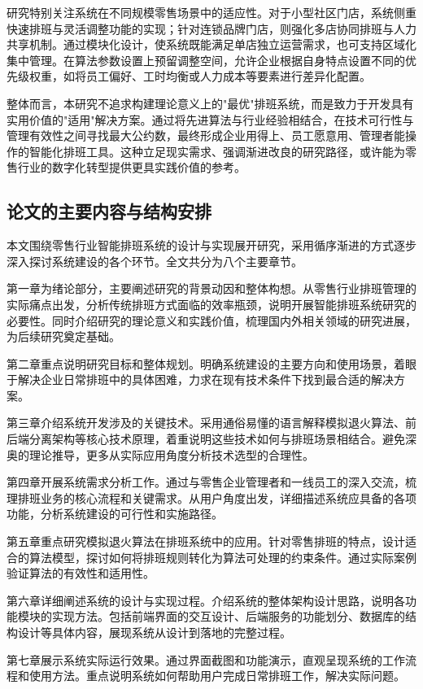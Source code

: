 \documentclass{ctexart}
\begin{document}
研究特别关注系统在不同规模零售场景中的适应性。对于小型社区门店，系统侧重快速排班与灵活调整功能的实现；针对连锁品牌门店，则强化多店协同排班与人力共享机制。通过模块化设计，使系统既能满足单店独立运营需求，也可支持区域化集中管理。在算法参数设置上预留调整空间，允许企业根据自身特点设置不同的优先级权重，如将员工偏好、工时均衡或人力成本等要素进行差异化配置。

整体而言，本研究不追求构建理论意义上的"最优"排班系统，而是致力于开发具有实用价值的"适用"解决方案。通过将先进算法与行业经验相结合，在技术可行性与管理有效性之间寻找最大公约数，最终形成企业用得上、员工愿意用、管理者能操作的智能化排班工具。这种立足现实需求、强调渐进改良的研究路径，或许能为零售行业的数字化转型提供更具实践价值的参考。

\subsection{论文的主要内容与结构安排}
本文围绕零售行业智能排班系统的设计与实现展开研究，采用循序渐进的方式逐步深入探讨系统建设的各个环节。全文共分为八个主要章节。

第一章为绪论部分，主要阐述研究的背景动因和整体构想。从零售行业排班管理的实际痛点出发，分析传统排班方式面临的效率瓶颈，说明开展智能排班系统研究的必要性。同时介绍研究的理论意义和实践价值，梳理国内外相关领域的研究进展，为后续研究奠定基础。

第二章重点说明研究目标和整体规划。明确系统建设的主要方向和使用场景，着眼于解决企业日常排班中的具体困难，力求在现有技术条件下找到最合适的解决方案。

第三章介绍系统开发涉及的关键技术。采用通俗易懂的语言解释模拟退火算法、前后端分离架构等核心技术原理，着重说明这些技术如何与排班场景相结合。避免深奥的理论推导，更多从实际应用角度分析技术选型的合理性。

第四章开展系统需求分析工作。通过与零售企业管理者和一线员工的深入交流，梳理排班业务的核心流程和关键需求。从用户角度出发，详细描述系统应具备的各项功能，分析系统建设的可行性和实施路径。

第五章重点研究模拟退火算法在排班系统中的应用。针对零售排班的特点，设计适合的算法模型，探讨如何将排班规则转化为算法可处理的约束条件。通过实际案例验证算法的有效性和适用性。

第六章详细阐述系统的设计与实现过程。介绍系统的整体架构设计思路，说明各功能模块的实现方法。包括前端界面的交互设计、后端服务的功能划分、数据库的结构设计等具体内容，展现系统从设计到落地的完整过程。

第七章展示系统实际运行效果。通过界面截图和功能演示，直观呈现系统的工作流程和使用方法。重点说明系统如何帮助用户完成日常排班工作，解决实际问题。
\end{document}
